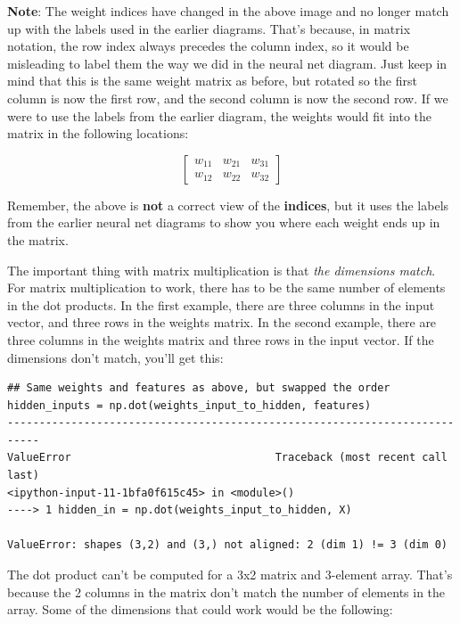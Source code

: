 \textbf{Note}: The weight indices have changed in the above image and no longer match up with the labels used in the earlier diagrams. That's because, in matrix notation, the row index always precedes the column index, so it would be misleading to label them the way we did in the neural net diagram. Just keep in mind that this is the same weight matrix as before, but rotated so the first column is now the first row, and the second column is now the second row. If we were to use the labels from the earlier diagram, the weights would fit into the matrix in the following locations:

\[
\begin{bmatrix}
w_{11} & w_{21} & w_{31} \\
w_{12} & w_{22} & w_{32}
\end{bmatrix}
\]

Remember, the above is \textbf{not} a correct view of the \textbf{indices}, but it uses the labels from the earlier neural net diagrams to show you where each weight ends up in the matrix. \newline

The important thing with matrix multiplication is that \textit{the dimensions match}. For matrix multiplication to work, there has to be the same number of elements in the dot products. In the first example, there are three columns in the input vector, and three rows in the weights matrix. In the second example, there are three columns in the weights matrix and three rows in the input vector. If the dimensions don't match, you'll get this:

\begin{lstlisting}
## Same weights and features as above, but swapped the order
hidden_inputs = np.dot(weights_input_to_hidden, features)
---------------------------------------------------------------------------
ValueError                                Traceback (most recent call last)
<ipython-input-11-1bfa0f615c45> in <module>()
----> 1 hidden_in = np.dot(weights_input_to_hidden, X)

ValueError: shapes (3,2) and (3,) not aligned: 2 (dim 1) != 3 (dim 0)
\end{lstlisting}

The dot product can't be computed for a 3x2 matrix and 3-element array. That's because the 2 columns in the matrix don't match the number of elements in the array. Some of the dimensions that could work would be the following:

